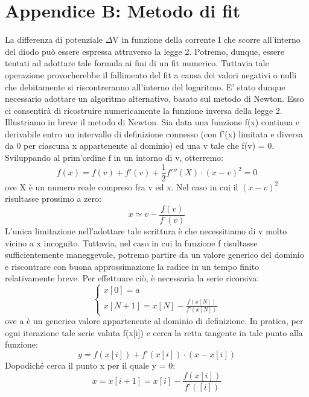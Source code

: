 \documentclass{article}[a4paper, oneside, 11pt]
\begin{document}
\section{Appendice B: Metodo di fit}\label{app: B}
La differenza di potenziale $\Delta$V in funzione della corrente I che scorre all’interno del diodo può essere espressa attraverso la legge 2. Potremo, dunque, essere tentati ad adottare tale formula ai fini di un fit numerico. Tuttavia tale operazione provocherebbe il fallimento del fit a causa dei valori negativi o nulli che debitamente si riscontreranno all’interno del logaritmo. E’ stato dunque necessario adottare un algoritmo alternativo, basato sul metodo di Newton. Esso ci consentirà di ricostruire numericamente la funzione inversa della legge 2.
Illustriamo in breve il metodo di Newton. Sia data una funzione f(x) continua e derivabile entro un intervallo di definizione connesso (con f’(x) limitata e diversa da 0 per ciascuna x appartenente al dominio) ed una v tale che f(v) = 0. Sviluppando al prim’ordine f in un intorno di v, otterremo:
\begin{equation}
f(x) = f(v) + f{'}(v) + {\frac{1}{2}} {f'{''}(X)} \cdot  {( x - v)^2} = 0
\end{equation}
ove X è un numero reale compreso fra v ed x. Nel caso in cui il $(x-v)^2 $risultasse prossimo a zero:
\begin{equation}
x \simeq v   -  {\frac {f(v)}{f’(v)}}
\end{equation}
L’unica limitazione nell’adottare tale scrittura è che necessitiamo di v molto vicino a x incognito. Tuttavia, nel caso in cui la funzione f risultasse sufficientemente maneggevole, potremo partire da un valore generico del dominio e riscontrare con buona approssimazione la radice in un tempo finito relativamente breve. Per effettuare ciò, è necessaria la serie ricorsiva:
\begin{equation}
\begin{cases}
x[0] = a \\ x[N+1] = x[N] - \frac {f(x[N])} {f’(x[N])}
\end{cases}
\end{equation}
ove a è un generico valore appartenente al dominio di definizione. In pratica, per ogni iterazione tale serie valuta f(x[i]) e cerca la retta tangente in tale punto alla funzione:
\begin{equation}
y = f(x[i]) + f’(x[i]) \cdot (x-x[i])
\end{equation}
 Dopodiché cerca il punto x per il quale y = 0:
\begin{equation}
x = x[i+1] = x[i] - \frac{f(x[i])}{f’([i])}
\end{equation}
\end{document}
